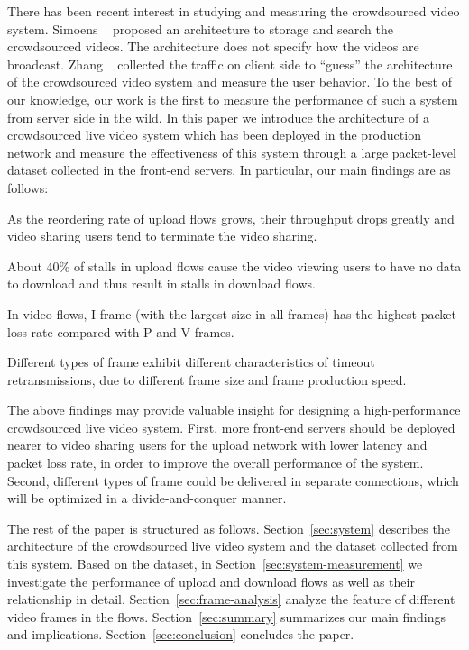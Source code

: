 There has been recent interest in studying and measuring the crowdsourced video system. Simoens \etal~\cite{simoens2013sigasight} proposed an architecture to storage and search the crowdsourced videos. The architecture does not specify how the videos are broadcast. Zhang \etal~\cite{zhang2015twitch} collected the traffic on client side to ``guess'' the architecture of the crowdsourced video system and measure the user behavior. To the best of our knowledge, our work is the first to measure the performance of such a system from server side in the wild. In this paper we introduce the architecture of a crowdsourced live video system which has been deployed in the production network and measure the effectiveness of this system through a large packet-level dataset collected in the front-end servers. In particular, our main findings are as follows:

\squishlist

\item As the reordering rate of upload flows grows, their throughput drops greatly and video sharing users tend to terminate the video sharing.

\item About 40\% of stalls in upload flows cause the video viewing users to have no data to download and thus result in stalls in download flows.

\item In video flows, I frame (with the largest size in all frames) has the highest packet loss rate compared with P and V frames.

\item Different types of frame exhibit different characteristics of timeout retransmissions, due to different frame size and frame production speed.    
\squishend

The above findings may provide valuable insight for designing a high-performance crowdsourced live video system. First, more front-end servers should be deployed nearer to video sharing users for the upload network with lower latency and packet loss rate, in order to improve the overall performance of the system. Second, different types of frame could be delivered in separate connections, which will be optimized in a divide-and-conquer manner. 

The rest of the paper is structured as follows. Section~\ref{sec:system} describes the architecture of the crowdsourced live video system and the dataset collected from this system. Based on the dataset, in Section~\ref{sec:system-measurement} we investigate the performance of upload and download flows as well as their relationship in detail. Section~\ref{sec:frame-analysis} analyze the feature of different video frames in the flows. Section~\ref{sec:summary} summarizes our main findings and implications. Section~\ref{sec:conclusion} concludes the paper.